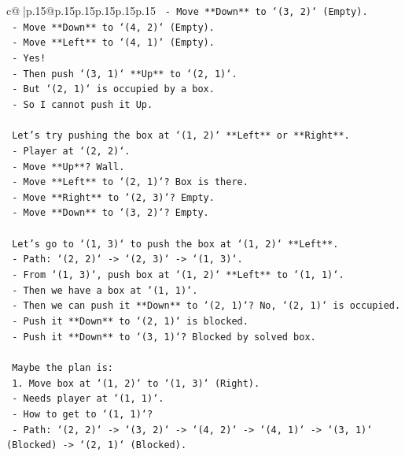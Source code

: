 \documentclass{article}
\begin{document}
{\begin{supertabular}{c@{$\;$}|p{.15\linewidth}@{}p{.15\linewidth}p{.15\linewidth}p{.15\linewidth}p{.15\linewidth}p{.15\linewidth}}
{{{\texttt{       {-} Move **Down** to `(3, 2)` (Empty).} \\
\texttt{       {-} Move **Down** to `(4, 2)` (Empty).} \\
\texttt{       {-} Move **Left** to `(4, 1)` (Empty).} \\
\texttt{       {-} Yes!} \\
\texttt{       {-} Then push `(3, 1)` **Up** to `(2, 1)`.} \\
\texttt{       {-} But `(2, 1)` is occupied by a box.} \\
\texttt{       {-} So I cannot push it Up.} \\
\\ 
\texttt{   Let's try pushing the box at `(1, 2)` **Left** or **Right**.} \\
\texttt{   {-} Player at `(2, 2)`.} \\
\texttt{   {-} Move **Up**? Wall.} \\
\texttt{   {-} Move **Left** to `(2, 1)`? Box is there.} \\
\texttt{   {-} Move **Right** to `(2, 3)`? Empty.} \\
\texttt{   {-} Move **Down** to `(3, 2)`? Empty.} \\
\\ 
\texttt{   Let's go to `(1, 3)` to push the box at `(1, 2)` **Left**.} \\
\texttt{   {-} Path: `(2, 2)` {-}> `(2, 3)` {-}> `(1, 3)`.} \\
\texttt{   {-} From `(1, 3)`, push box at `(1, 2)` **Left** to `(1, 1)`.} \\
\texttt{   {-} Then we have a box at `(1, 1)`.} \\
\texttt{   {-} Then we can push it **Down** to `(2, 1)`? No, `(2, 1)` is occupied.} \\
\texttt{   {-} Push it **Down** to `(2, 1)` is blocked.} \\
\texttt{   {-} Push it **Down** to `(3, 1)`? Blocked by solved box.} \\
\\ 
\texttt{   Maybe the plan is:} \\
\texttt{   1. Move box at `(1, 2)` to `(1, 3)` (Right).} \\
\texttt{      {-} Needs player at `(1, 1)`.} \\
\texttt{      {-} How to get to `(1, 1)`?} \\
\texttt{      {-} Path: `(2, 2)` {-}> `(3, 2)` {-}> `(4, 2)` {-}> `(4, 1)` {-}> `(3, 1)` (Blocked) {-}> `(2, 1)` (Blocked).} \\
}}}
\end{supertabular}}
\end{document}
